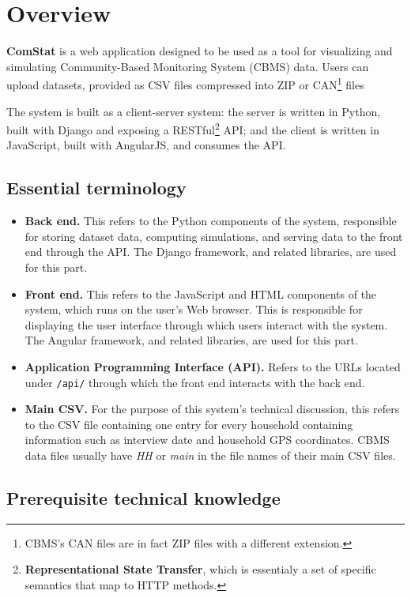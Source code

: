 
\section{Overview}

\textbf{ComStat} is a web application designed to be used as a tool for visualizing and simulating Community-Based Monitoring System (CBMS) data. Users can upload datasets, provided as CSV files compressed into ZIP or
CAN\footnote{CBMS's CAN files are in fact ZIP files with a different extension.}
files

The system is built as a client-server system: the server is written in Python, built with Django and exposing a
RESTful\footnote{\textbf{Representational State Transfer}, which is essentialy a set of specific semantics that map to HTTP methods.}
API; and the client is written in JavaScript, built with AngularJS, and consumes the API.


\subsection{Essential terminology}

\begin{itemize}
    \item \textbf{Back end.} This refers to the Python components of the system, responsible for storing dataset data, computing simulations, and serving data to the front end through the API. The Django framework, and related libraries, are used for this part.
    \item \textbf{Front end.} This refers to the JavaScript and HTML components of the system, which runs on the user's Web browser. This is responsible for displaying the user interface through which users interact with the system. The Angular framework, and related libraries, are used for this part.
    \item \textbf{Application Programming Interface (API).} Refers to the URLs located under \texttt{/api/} through which the front end interacts with the back end.
    \item \textbf{Main CSV.} For the purpose of this system's technical discussion, this refers to the CSV file containing one entry for every household containing information such as interview date and household GPS coordinates. CBMS data files usually have \emph{HH} or \emph{main} in the file names of their main CSV files.
\end{itemize}


\subsection{Prerequisite technical knowledge}

